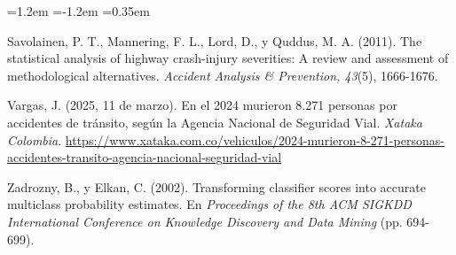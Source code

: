 \documentclass[11pt,a4paper]{article}
\begin{document}
\begin{list}{}{\leftmargin=1.2em \itemindent=-1.2em \itemsep=0.35em \parsep=0pt}
\item Savolainen, P. T., Mannering, F. L., Lord, D., y Quddus, M. A. (2011). The statistical analysis of highway crash-injury severities: A review and assessment of methodological alternatives. \textit{Accident Analysis \& Prevention, 43}(5), 1666-1676.
\item Vargas, J. (2025, 11 de marzo). En el 2024 murieron 8.271 personas por accidentes de tránsito, según la Agencia Nacional de Seguridad Vial. \textit{Xataka Colombia}. \url{https://www.xataka.com.co/vehiculos/2024-murieron-8-271-personas-accidentes-transito-agencia-nacional-seguridad-vial}
\item Zadrozny, B., y Elkan, C. (2002). Transforming classifier scores into accurate multiclass probability estimates. En \textit{Proceedings of the 8th ACM SIGKDD International Conference on Knowledge Discovery and Data Mining} (pp. 694-699).
\end{list}
\end{document}
